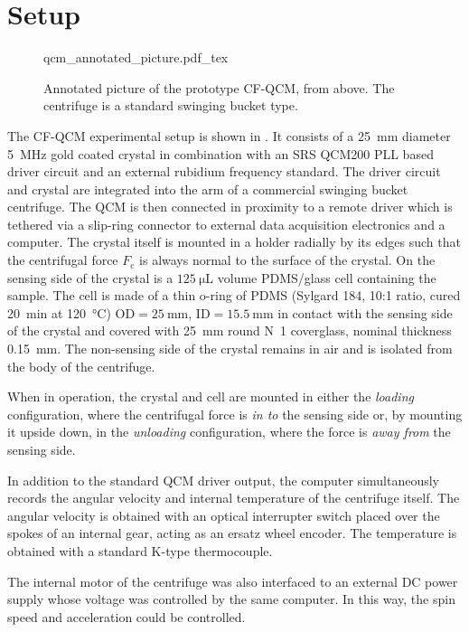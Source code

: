 \section{Setup}
\begin{figure}[ht]
\centering
{qcm_annotated_picture.pdf_tex}
\caption{Annotated picture of the prototype CF-QCM, from above.  The
centrifuge is a standard swinging bucket type.}
\label{fig:cfqcmexpsetup}
\end{figure}

The CF-QCM experimental setup is shown in .  It
consists of a \SI{25}{\milli\meter} diameter \SI{5}{\mega\hertz} gold
coated crystal in combination with an SRS QCM200 PLL based driver circuit
and an external rubidium frequency standard.  The driver circuit and
crystal are integrated into the arm of a commercial swinging bucket
centrifuge.  The QCM is then connected in proximity to a remote driver
which is tethered via a slip-ring connector to external data acquisition
electronics and a computer.  The crystal itself is mounted in a holder
radially by its edges such that the centrifugal force $F_\mathrm{c}$ is
always normal to the surface of the crystal.  On the sensing side of the
crystal is a $\SI{125}{\micro\liter}$ volume PDMS/glass cell containing the
sample.  The cell is made of a thin o-ring of PDMS (Sylgard 184, 10:1
ratio, cured \SI{20}{\minute} at \SI{120}{\celsius})
$\text{OD}=\SI{25}{\milli\meter}$, $\text{ID}=\SI{15.5}{\milli\meter}$ in
contact with the sensing side of the crystal and covered with
\SI{25}{\milli\meter} round N~1
coverglass, nominal thickness \SI{0.15}{\milli\meter}.  The non-sensing
side of the crystal remains in air and is isolated from the body of the
centrifuge.  

When in operation, the crystal and cell are mounted in either the
\textit{loading} configuration, where the centrifugal force is \textit{in
to} the sensing side or, by mounting it upside down, in the
\textit{unloading} configuration, where the force is \textit{away from} the
sensing side.

In addition to the standard QCM driver output, the computer simultaneously
records the angular velocity and internal temperature of the centrifuge
itself.  The angular velocity is obtained with an optical interrupter
switch placed over the spokes of an internal gear, acting as an ersatz
wheel encoder.  The temperature is obtained with a standard K-type
thermocouple.

The internal motor of the centrifuge was also interfaced to an external DC
power supply whose voltage was controlled by the same computer.  In this
way, the spin speed and acceleration could be controlled.


